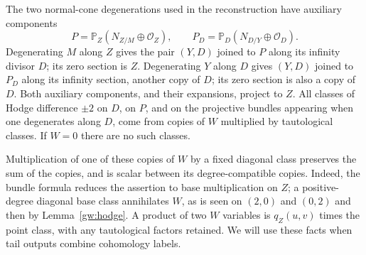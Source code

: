 The two normal-cone degenerations used in the reconstruction have
auxiliary components
\[
 P=\mathbb P_Z(N_{Z/M}\oplus\mathcal O_Z),\qquad
 P_D=\mathbb P_D(N_{D/Y}\oplus\mathcal O_D).
\]
Degenerating $M$ along $Z$ gives the pair $(Y,D)$ joined to $P$ along its
infinity divisor $D$; its zero section is $Z$.
Degenerating $Y$ along $D$ gives $(Y,D)$ joined to $P_D$ along its infinity
section, another copy of $D$; its zero section is also a copy of $D$.
Both auxiliary components, and their expansions, project to $Z$.
All classes of Hodge difference $\pm2$ on $D$, on
$P$, and on the projective bundles
appearing when one degenerates along $D$, come from copies of $W$ multiplied
by tautological classes.  If $W=0$ there are no such classes.

Multiplication of one of these copies of $W$ by a fixed diagonal class
preserves the sum of the copies, and is scalar between its degree-compatible
copies.  Indeed, the bundle formula reduces the assertion to base
multiplication on $Z$; a positive-degree diagonal base class annihilates
$W$, as is seen on $(2,0)$ and $(0,2)$ and then by
Lemma~\ref{gw:hodge}.  A product of two $W$ variables is $q_Z(u,v)$ times
the point class, with any tautological factors retained.  We will use these
facts when tail outputs combine cohomology labels.


